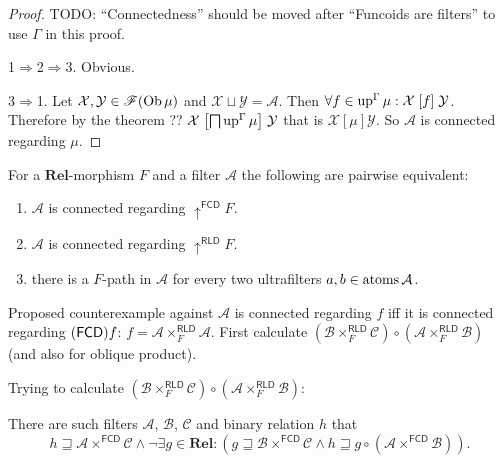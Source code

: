 \begin{proof}
  TODO: ``Connectedness'' should be moved after ``Funcoids are filters'' to
  use $\Gamma$ in this proof.

  1$\Rightarrow$2$\Rightarrow$3. Obvious.

  3$\Rightarrow$1. Let $\mathcal{X}, \mathcal{Y} \in \mathscr{F} (\operatorname{Ob}
  \mu)$ and $\mathcal{X} \sqcup \mathcal{Y} = \mathcal{A}$. Then $\forall f
  \in \operatorname{up}^{\Gamma} \mu : \mathcal{X} \mathrel{\left[f\right]} \mathcal{Y}$.
  Therefore by the theorem ?? $\mathcal{X} \mathrel{\left[ \bigsqcap
  \operatorname{up}^{\Gamma} \mu \right]} \mathcal{Y}$ that is $\mathcal{X}
  \mathrel{[\mu]} \mathcal{Y}$. So $\mathcal{A}$ is connected regarding $\mu$.
\end{proof}

\begin{conjecture}
  For a $\mathbf{Rel}$-morphism $F$ and a filter $\mathcal{A}$ the
  following are pairwise equivalent:
  \begin{enumerate}
    \item $\mathcal{A}$ is connected regarding $\uparrow^{\mathsf{FCD}}
    F$.

    \item $\mathcal{A}$ is connected regarding $\uparrow^{\mathsf{RLD}}
    F$.

    \item there is a $F$-path in $\mathcal{A}$ for every two
    ultrafilters $a,b\in\operatorname{atoms}\mathcal{A}$.
  \end{enumerate}
\end{conjecture}

Proposed counterexample against $\mathcal{A}$ is connected regarding
$f$ iff it is connected regarding $(\mathsf{FCD}) f$:
$f = \mathcal{A}\times^{\mathsf{RLD}}_{F}\mathcal{A}$.
First calculate
$(\mathcal{B}\times^{\mathsf{RLD}}_{F}\mathcal{C})\circ
(\mathcal{A}\times^{\mathsf{RLD}}_{F}\mathcal{B})$
(and also for oblique product).

Trying to calculate
$(\mathcal{B}\times^{\mathsf{RLD}}_{F}\mathcal{C})\circ
(\mathcal{A}\times^{\mathsf{RLD}}_{F}\mathcal{B})$:

\begin{lem}
  There are such filters $\mathcal{A}$, $\mathcal{B}$, $\mathcal{C}$ and
  binary relation $h$ that
  \[ h \sqsupseteq \mathcal{A} \times^{\mathsf{FCD}} \mathcal{C} \wedge
     \neg \exists g \in \mathbf{Rel} : (g \sqsupseteq \mathcal{B}
     \times^{\mathsf{FCD}} \mathcal{C} \wedge h \sqsupseteq g \circ
     (\mathcal{A} \times^{\mathsf{FCD}} \mathcal{B})) . \]
\end{lem}

